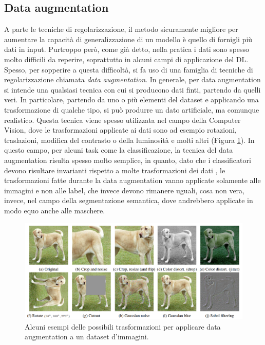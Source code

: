 \subsection{Data augmentation}
\label{data_augmentation}
A parte le tecniche di regolarizzazione, il metodo sicuramente migliore per aumentare la capacità di generalizzazione di un modello è quello di fornigli più dati in input. Purtroppo però, come già detto, nella pratica i dati sono spesso molto difficili da reperire, soprattutto in alcuni campi di applicazione del DL. Spesso, per sopperire a questa difficoltà, si fa uso di una famiglia di tecniche di regolarizzazione chiamata \textit{data augmentation}. In generale, per data augmentation si intende una qualsiasi tecnica con cui si producono dati finti, partendo  da quelli veri. In particolare, partendo da uno o più elementi del dataset e applicando una trasformazione di qualche tipo, si può produrre un dato artificiale, ma comunque realistico. Questa tecnica viene spesso utilizzata nel campo della Computer Vision, dove le trasformazioni applicate ai dati sono ad esempio rotazioni, traslazioni, modifica del contrasto o della luminosità e molti altri (Figura \ref{fig:example-data_aug}). In questo campo, per alcuni task come la classificazione, la tecnica del data augmentation risulta spesso molto semplice, in quanto, dato che i classificatori devono risultare invarianti rispetto a molte trasformazioni dei dati \cite{goodfellow2016deep}, le trasformazioni fatte durante la data augmentation vanno applicate solamente alle immagini e non alle label, che invece devono rimanere uguali, cosa non vera, invece, nel campo della segmentazione semantica, dove andrebbero applicate in modo equo anche alle maschere.

\begin{figure}[h!]
  \hspace*{0.1in}
  \includegraphics[scale=0.3]{img/example_data_aug.png}
  \caption{Alcuni esempi delle possibili trasformazioni per applicare data augmentation a un dataset d'immagini.}
  \label{fig:example-data_aug}
\end{figure}

